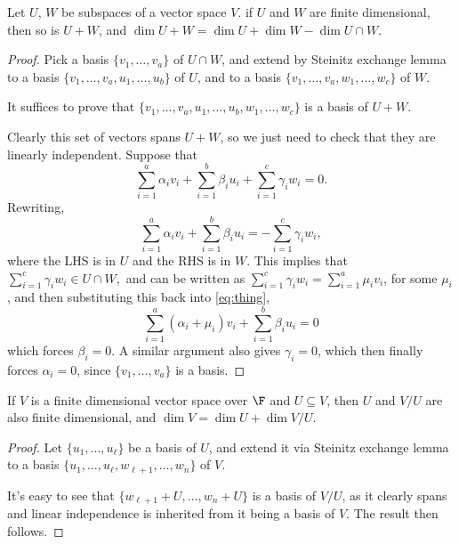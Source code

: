 \documentclass[a4paper]{scrartcl}
\begin{document}
\begin{proposition}
    Let $U$, $W$ be subspaces of a vector space $V$. if $U$ and $W$ are finite dimensional, then so is $U + W$, and $\dim U + W = \dim U + \dim W - \dim U \cap W$.
\end{proposition}
\begin{proof}
    Pick a basis $\{v_1, \dots, v_a\}$ of $U \cap W$, and extend by Steinitz exchange lemma to a basis $\{v_1, \dots, v_a, u_1, \dots, u_b\}$ of $U$, and to a basis $\{v_1, \dots, v_a, w_1, \dots, w_c\}$ of $W$.
    
    It suffices to prove that $\{v_1, \dots, v_a, u_1, \dots, u_b, w_1, \dots, w_c\}$ is a basis of $U + W$.

    Clearly this set of vectors spans $U + W$, so we just need to check that they are linearly independent. Suppose that
    $$
    \sum_{i = 1}^{a} \alpha_i v_i + \sum_{i = 1}^b \beta_i u_i + \sum_{i = 1}^c \gamma_i w_i = 0.
    $$
    Rewriting,
    \begin{equation}\label{eq:thing}
        \sum_{i = 1}^{a} \alpha_i v_i + \sum_{i = 1}^b \beta_i u_i = -\sum_{i = 1}^c \gamma_i w_i, \tag{$\dagger$}
    \end{equation}
    where the LHS is in $U$ and the RHS is in $W$. This implies that
    $
    \sum_{i = 1}^c \gamma_i w_i \in U \cap W,
    $
    and can be written as 
    $
    \sum_{i = 1}^c \gamma_i w_i = \sum_{i = 1}^a  \mu_i v_i$,
    for some $\mu_i$, and then substituting this back into \eqref{eq:thing},
    $$
    \sum_{i = 1}^a (\alpha_i + \mu_i) v_i + \sum_{i = 1}^b \beta_i u_i = 0
    $$
    which forces $\beta_i = 0$. A similar argument also gives $\gamma_i = 0$, which then finally forces $\alpha_i = 0$, since $\{v_1, \dots, v_a\}$ is a basis.
\end{proof}

\begin{proposition}
    If $V$ is a finite dimensional vector space over $\F$ and $U \subseteq V$, then $U$ and $V / U$ are also finite dimensional, and $\dim V = \dim U + \dim V / U$.
\end{proposition}
\begin{proof}
    Let $\{u_1, \dots, u_\ell\}$ be a basis of $U$, and extend it via Steinitz exchange lemma to a basis $\{u_1, \dots, u_\ell, w_{\ell+1}, \dots, w_n\}$ of $V$.

    It's easy to see that $\{w_{\ell + 1} + U, \dots, w_{n} + U\}$ is a basis of $V/U$, as it clearly spans and linear independence is inherited from it being a basis of $V$. The result then follows.
\end{proof}
\end{document}
